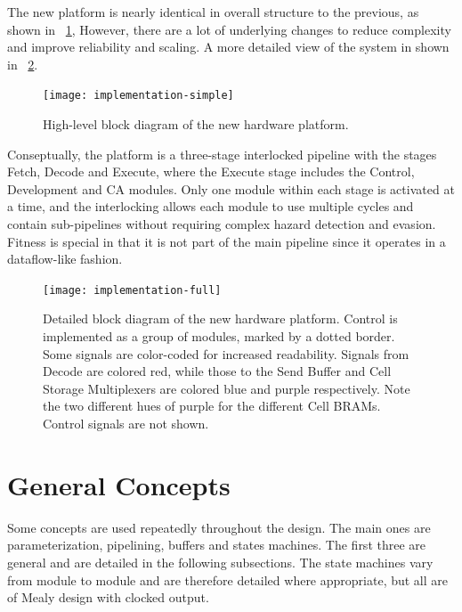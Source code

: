 The new platform is nearly identical in overall structure to the previous, as shown in \figurename~\ref{fig:implementation-simple},
However, there are a lot of underlying changes to reduce complexity and improve reliability and scaling.
A more detailed view of the system in shown in \figurename~\ref{fig:implementation-full}.

\begin{figure}[!ht]
    \centering
    \texttt{[image: implementation-simple]}
    \caption[High-level system diagram]{
        High-level block diagram of the new hardware platform.
    }
    \label{fig:implementation-simple}
\end{figure}

Conseptually, the platform is a three-stage interlocked pipeline with the stages Fetch, Decode and Execute, where the Execute stage includes the Control, Development and CA modules.
Only one module within each stage is activated at a time, and the interlocking allows each module to use multiple cycles and contain sub-pipelines without requiring complex hazard detection and evasion.
Fitness is special in that it is not part of the main pipeline since it operates in a dataflow-like fashion.

\begin{figure}
    \centering
    \texttt{[image: implementation-full]}
    \caption[Detailed system diagram]{
        Detailed block diagram of the new hardware platform.
        Control is implemented as a group of modules, marked by a dotted border.
        Some signals are color-coded for increased readability.
        Signals from Decode are colored red, while those to the Send Buffer and Cell Storage Multiplexers are colored blue and purple respectively.
        Note the two different hues of purple for the different Cell BRAMs.
        Control signals are not shown.
    }
    \label{fig:implementation-full}
\end{figure}


\section{General Concepts}

Some concepts are used repeatedly throughout the design.
The main ones are parameterization, pipelining, buffers and states machines.
The first three are general and are detailed in the following subsections.
The state machines vary from module to module and are therefore detailed where appropriate, but all are of Mealy design with clocked output.

